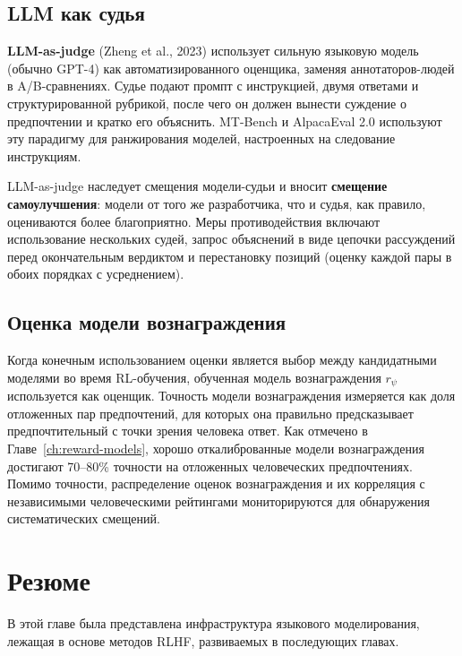 \subsection{LLM как судья}

\textbf{LLM-as-judge} (Zheng et al., 2023) использует сильную языковую модель (обычно GPT-4) как автоматизированного оценщика, заменяя аннотаторов-людей в A/B-сравнениях. Судье подают промпт с инструкцией, двумя ответами и структурированной рубрикой, после чего он должен вынести суждение о предпочтении и кратко его объяснить. MT-Bench и AlpacaEval 2.0 используют эту парадигму для ранжирования моделей, настроенных на следование инструкциям.

LLM-as-judge наследует смещения модели-судьи и вносит \textbf{смещение самоулучшения}: модели от того же разработчика, что и судья, как правило, оцениваются более благоприятно. Меры противодействия включают использование нескольких судей, запрос объяснений в виде цепочки рассуждений перед окончательным вердиктом и перестановку позиций (оценку каждой пары в обоих порядках с усреднением).

\subsection{Оценка модели вознаграждения}

Когда конечным использованием оценки является выбор между кандидатными моделями во время RL-обучения, обученная модель вознаграждения $r_\psi$ используется как оценщик. Точность модели вознаграждения измеряется как доля отложенных пар предпочтений, для которых она правильно предсказывает предпочтительный с точки зрения человека ответ. Как отмечено в Главе~\ref{ch:reward-models}, хорошо откалиброванные модели вознаграждения достигают 70--80\% точности на отложенных человеческих предпочтениях. Помимо точности, распределение оценок вознаграждения и их корреляция с независимыми человеческими рейтингами мониторируются для обнаружения систематических смещений.

\section{Резюме}
\label{sec:lm-summary}

В этой главе была представлена инфраструктура языкового моделирования, лежащая в основе методов RLHF, развиваемых в последующих главах.

